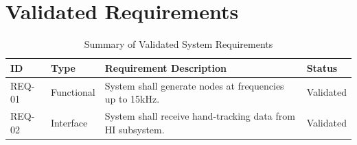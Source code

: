 \section{Validated Requirements}
\begin{table}[h]
    \centering
    \small
    \begin{tabular}{@{}llp{9.5cm}l@{}}
        \toprule
        \textbf{ID} & \textbf{Type} & \textbf{Requirement Description} & \textbf{Status} \\ \midrule
        REQ-01 & Functional & System shall generate nodes at frequencies up to 15kHz. & Validated \\
        REQ-02 & Interface & System shall receive hand-tracking data from HI subsystem. & Validated \\ \bottomrule
    \end{tabular}
    \caption{Summary of Validated System Requirements}
\end{table}